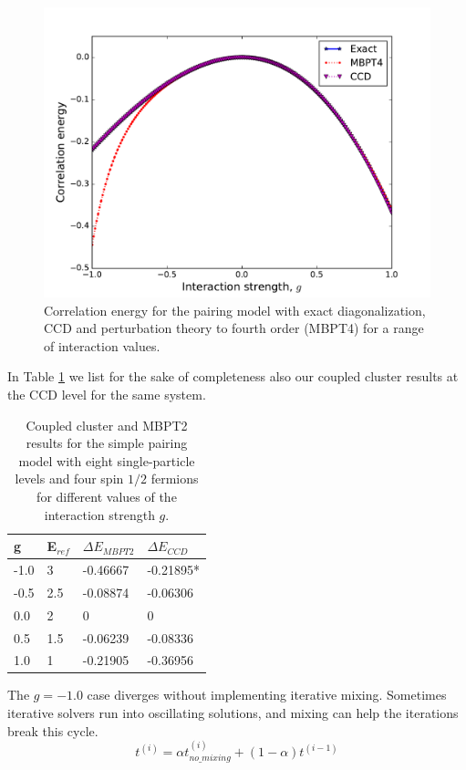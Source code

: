   \begin{figure}
    \includegraphics[width=\linewidth]{Chapter8-figures/CCDMBPT4theory.pdf}
    \caption{Correlation energy for the pairing model with exact diagonalization, CCD and perturbation theory to fourth order (MBPT4) for a range of interaction values.}
    \label{fig:pairingccmbpt4}
  \end{figure}
In Table \ref{tab:selectedbenchmarks} we list for the sake of completeness also our coupled cluster results at the CCD level for the same system.
\begin{table}
\caption{Coupled cluster and MBPT2 results for the simple pairing model with eight single-particle levels and four spin $1/2$ fermions
for different values of the interaction strength $g$.} \label{tab:selectedbenchmarks}
  \begin{center}
      \begin{tabular}{| l | l | l | l |}
      \hline g & E$_{ref}$ & $\Delta E_{MBPT2}$ & $\Delta E_{CCD}$
      \\ \hline -1.0 & 3 & -0.46667 & -0.21895* \\ \hline -0.5 & 2.5 &
      -0.08874 & -0.06306 \\ \hline 0.0 & 2 & 0 & 0 \\ \hline 0.5 &
      1.5 & -0.06239 & -0.08336 \\ \hline 1.0 & 1 & -0.21905 &
      -0.36956 \\ \hline
      \end{tabular}
  \end{center}
\end{table}
  The $g=-1.0$ case diverges without implementing iterative
  mixing. Sometimes iterative solvers run into oscillating solutions,
  and mixing can help the iterations break this cycle.
  \begin{equation}
  t^{(i)} = \alpha t^{(i)}_{no\_mixing} + (1 - \alpha) t^{(i-1)}
  \end{equation}




